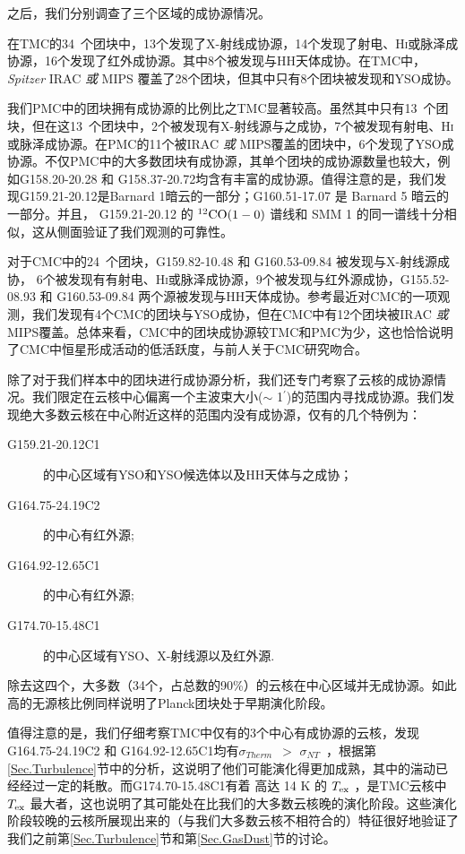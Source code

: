\documentclass[UTF8, nocolorlinks]{pkuthss}
\newcommand{\coaa}{$\rm^{12}CO(1-0)$ }
\newcommand{\texc}{$T_{\rm {ex}}$ }
\newcommand{\sigmath}{$\sigma _{Therm}$\ }
\newcommand{\sigmant}{$\sigma _{NT}$\ }
\newcommand{\arcmin}{$^{\prime}$}
\newcommand{\numsoutmc}{34\ }
\newcommand{\numsoupmc}{13\ }
\newcommand{\numsoucmc}{24\ }
\begin{document}
		之后，我们分别调查了三个区域的成协源情况。

		在TMC的\numsoutmc 个团块中，13个发现了X-射线成协源，14个发现了射电、H\textsc{i}或脉泽成协源，16个发现了红外成协源。其中8个被发现与HH天体成协。在TMC中，\emph{Spitzer} IRAC \emph{或} MIPS 覆盖了28个团块，但其中只有8个团块被发现和YSO成协。

		我们PMC中的团块拥有成协源的比例比之TMC显著较高。虽然其中只有\numsoupmc 个团块，但在这\numsoupmc 个团块中，2个被发现有X-射线源与之成协，7个被发现有射电、H\textsc{i}或脉泽成协源。在PMC的11个被IRAC \emph{或} MIPS覆盖的团块中，6个发现了YSO成协源。不仅PMC中的大多数团块有成协源，其单个团块的成协源数量也较大，例如G158.20-20.28 和 G158.37-20.72均含有丰富的成协源。值得注意的是，我们发现G159.21-20.12是Barnard 1暗云的一部分\supercite{1986ApJ...303L..11G}；G160.51-17.07 是 Barnard 5 暗云的一部分\supercite{2010ApJ...712..778H}。并且， G159.21-20.12 的 \coaa 谱线和 SMM 1 的同一谱线十分相似\supercite{2010ApJ...712..778H}，这从侧面验证了我们观测的可靠性。

		对于CMC中的\numsoucmc 个团块，G159.82-10.48 和 G160.53-09.84 被发现与X-射线源成协， 6个被发现有有射电、H\textsc{i}或脉泽成协源，9个被发现与红外源成协，G155.52-08.93 和 G160.53-09.84 两个源被发现与HH天体成协。参考最近对CMC的一项观测\supercite{2013ApJ...764..133H}，我们发现有4个CMC的团块与YSO成协，但在CMC中有12个团块被IRAC \emph{或} MIPS覆盖。总体来看，CMC中的团块成协源较TMC和PMC为少，这也恰恰说明了CMC中恒星形成活动的低活跃度，与前人关于CMC研究吻合。

		除了对于我们样本中的团块进行成协源分析，我们还专门考察了云核的成协源情况。我们限定在云核中心偏离一个主波束大小($\sim$ 1\arcmin )的范围内寻找成协源。我们发现绝大多数云核在中心附近这样的范围内没有成协源，仅有的几个特例为：

		\begin{description}
		\item[G159.21-20.12C1]的中心区域有YSO和YSO候选体以及HH天体与之成协；
		\item[G164.75-24.19C2]的中心有红外源;
		\item[G164.92-12.65C1]的中心有红外源;
		\item[G174.70-15.48C1]的中心区域有YSO、X-射线源以及红外源.
		\end{description}

		除去这四个，大多数（34个，占总数的90\%）的云核在中心区域并无成协源。如此高的无源核比例同样说明了Planck团块处于早期演化阶段。

		值得注意的是，我们仔细考察TMC中仅有的3个中心有成协源的云核，发现 G164.75-24.19C2 和 G164.92-12.65C1均有\sigmath $>$ \sigmant ，根据第\ref{Sec.Turbulence}节中的分析，这说明了他们可能演化得更加成熟，其中的湍动已经经过一定的耗散。而G174.70-15.48C1有着 高达 14 K 的 \texc ，是TMC云核中\texc 最大者，这也说明了其可能处在比我们的大多数云核晚的演化阶段。这些演化阶段较晚的云核所展现出来的（与我们大多数云核不相符合的）特征很好地验证了我们之前第\ref{Sec.Turbulence}节和第\ref{Sec.GasDust}节的讨论。
\end{document}
